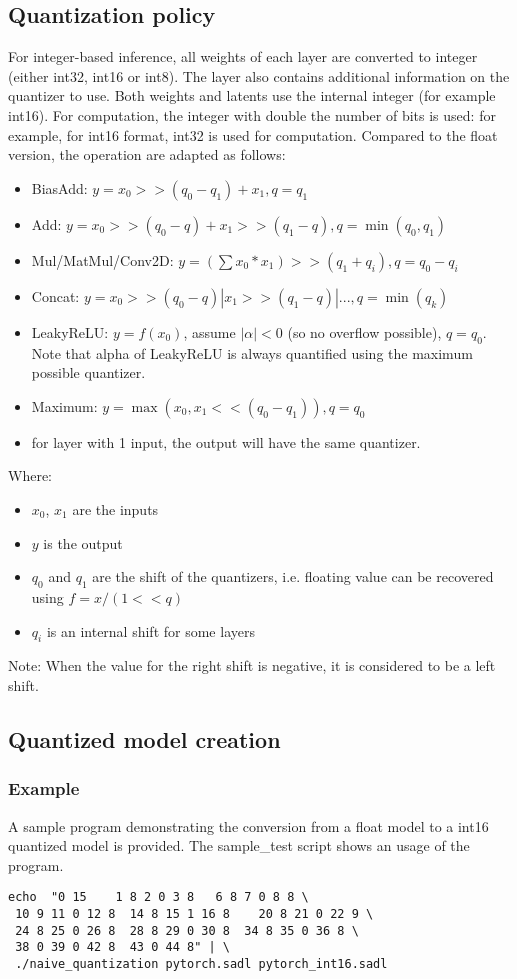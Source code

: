 \documentclass[10pt,a4paper]{article}
\begin{document}
\subsection{Quantization policy}
For integer-based inference, all weights of each layer are converted to integer (either int32, int16 or int8). The layer also contains additional information on the quantizer to use.
Both weights and latents use the internal integer (for example int16). For computation, the integer with double the number of bits is used: for example, for int16 format, int32 is used for computation.
Compared to the float version, the operation are adapted as follows:
\begin{itemize}
\item BiasAdd: $y = x_0>>(q_0-q_1) + x_1, q=q_1$
\item Add: $y = x_0>>(q_0-q) + x_1>>(q_1-q), q=\min(q_0,q_1)$
\item Mul/MatMul/Conv2D: $y = (\sum x_0*x_1)>>(q_1+q_i), q=q_0-q_i$
\item Concat: $y = x_0>>(q_0-q)|x_1>>(q_1-q)|..., q=\min(q_k)$ 
\item LeakyReLU: $y = f(x_0)$, assume $|\alpha| < 0$ (so no overflow possible), $q=q_0$. Note that alpha of LeakyReLU is always quantified using the maximum possible quantizer.
\item Maximum: $y = \max(x_0, x_1<<(q_0-q_1)), q=q_0$
\item for layer with 1 input, the output will have the same quantizer.
\end{itemize}
Where:
\begin{itemize}
\item $x_0$, $x_1$ are the inputs
\item $y$ is the output
\item $q_0$ and $q_1$ are the shift of the quantizers, i.e. floating value can be recovered using $f = x/(1<<q)$
\item $q_i$ is an internal shift for some layers
\end{itemize}

Note: When the value for the right shift is negative, it is considered to be a left shift.

\subsection{Quantized model creation}
\subsubsection{Example}
A sample program demonstrating the conversion from a float model to a int16 quantized model is provided. The sample\_test script shows an usage of the program.
\begin{lstlisting}[caption={SADL quantized model conversion},style=code]
echo  "0 15    1 8 2 0 3 8   6 8 7 0 8 8 \
 10 9 11 0 12 8  14 8 15 1 16 8    20 8 21 0 22 9 \
 24 8 25 0 26 8  28 8 29 0 30 8  34 8 35 0 36 8 \
 38 0 39 0 42 8  43 0 44 8" | \
 ./naive_quantization pytorch.sadl pytorch_int16.sadl
\end{lstlisting}
\end{document}
